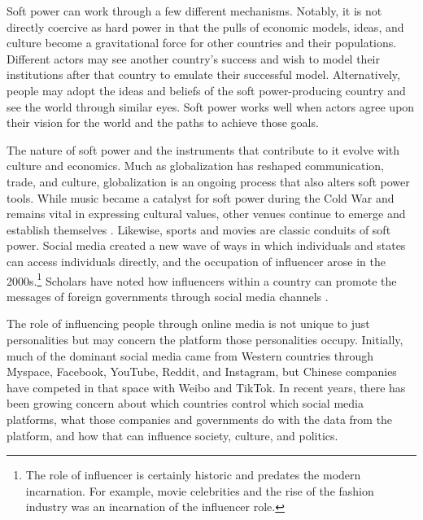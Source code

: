 Soft power can work through a few different mechanisms. Notably, it is not directly coercive as hard power in that the pulls of economic models, ideas, and culture become a gravitational force for other countries and their populations. Different actors may see another country's success and wish to model their institutions after that country to emulate their successful model. Alternatively, people may adopt the ideas and beliefs of the soft power-producing country and see the world through similar eyes. Soft power works well when actors agree upon their vision for the world and the paths to achieve those goals.

The nature of soft power and the instruments that contribute to it evolve with culture and economics. Much as globalization has reshaped communication, trade, and culture, globalization is an ongoing process that also alters soft power tools. While music became a catalyst for soft power during the Cold War and remains vital in expressing cultural values, other venues continue to emerge and establish themselves \cite{nye2004}. Likewise, sports and movies are classic conduits of soft power\cite{sari2012,grix2014}. Social media created a new wave of ways in which individuals and states can access individuals directly, and the occupation of influencer arose in the 2000s.\footnote{The role of influencer is certainly historic and predates the modern incarnation. For example, movie celebrities and the rise of the fashion industry was an incarnation of the influencer role.} Scholars have noted how influencers within a country can promote the messages of foreign governments through social media channels \cite{vibber2021}. 

The role of influencing people through online media is not unique to just personalities but may concern the platform those personalities occupy. Initially, much of the dominant social media came from Western countries through Myspace, Facebook, YouTube, Reddit, and Instagram, but Chinese companies have competed in that space with Weibo and TikTok. In recent years, there has been growing concern about which countries control which social media platforms, what those companies and governments do with the data from the platform, and how that can influence society, culture, and politics.  

